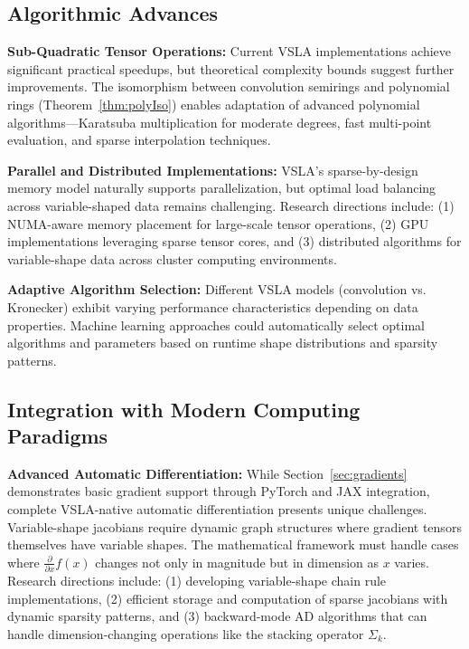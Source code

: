 \documentclass[11pt]{article}
\begin{document}
\subsection{Algorithmic Advances}

\textbf{Sub-Quadratic Tensor Operations:} Current VSLA implementations achieve significant practical speedups, but theoretical complexity bounds suggest further improvements. The isomorphism between convolution semirings and polynomial rings (Theorem~\ref{thm:polyIso}) enables adaptation of advanced polynomial algorithms—Karatsuba multiplication for moderate degrees, fast multi-point evaluation, and sparse interpolation techniques.

\textbf{Parallel and Distributed Implementations:} VSLA's sparse-by-design memory model naturally supports parallelization, but optimal load balancing across variable-shaped data remains challenging. Research directions include: (1) NUMA-aware memory placement for large-scale tensor operations, (2) GPU implementations leveraging sparse tensor cores, and (3) distributed algorithms for variable-shape data across cluster computing environments.

\textbf{Adaptive Algorithm Selection:} Different VSLA models (convolution vs. Kronecker) exhibit varying performance characteristics depending on data properties. Machine learning approaches could automatically select optimal algorithms and parameters based on runtime shape distributions and sparsity patterns.

\subsection{Integration with Modern Computing Paradigms}

\textbf{Advanced Automatic Differentiation:} While Section~\ref{sec:gradients} demonstrates basic gradient support through PyTorch and JAX integration, complete VSLA-native automatic differentiation presents unique challenges. Variable-shape jacobians require dynamic graph structures where gradient tensors themselves have variable shapes. The mathematical framework must handle cases where $\frac{\partial}{\partial x} f(x)$ changes not only in magnitude but in dimension as $x$ varies. Research directions include: (1) developing variable-shape chain rule implementations, (2) efficient storage and computation of sparse jacobians with dynamic sparsity patterns, and (3) backward-mode AD algorithms that can handle dimension-changing operations like the stacking operator $\Sigma_k$.
\end{document}
